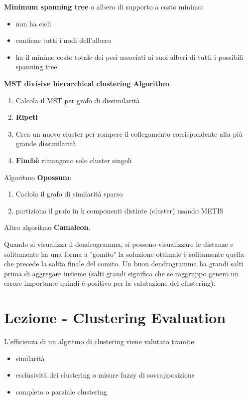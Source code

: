 \textbf{Minimum spanning tree} o albero di supporto a costo minimo:
\begin{itemize}
	\item non ha cicli
	\item contiene tutti i nodi dell'albero
	\item ha il minimo costo totale dei pesi associati ai suoi alberi di tutti i possibili spanning tree
\end{itemize}
\noindent
\textbf{MST divisive hierarchical clustering Algorithm}
\begin{enumerate}
	\item Calcola il MST per grafo di dissimilarit\`a
	\item \textbf{Ripeti}
	\item Crea un nuovo cluster per rompere il collegamento corrispondente alla pi\`u grande dissimilarit\`a
	\item \textbf{Finch\`e} rimangono solo cluster singoli
\end{enumerate}
\noindent
Algoritmo \textbf{Opossum}:
\begin{enumerate}
	\item Caclola il grafo di similarit\`a sparso
	\item partiziona il grafo in k componenti distinte (cluster) usando METIS
\end{enumerate}
\noindent
Altro algoritmo \textbf{Camaleon}.

Quando si visualizza il dendrogramma, si possono visualizzare le distanze e solitamente ha una forma a "gomito" la soluzione ottimale \`e solitamente quella che precede la salita finale del comito. Un buon dendrogramma ha grandi salti prima di aggregare insieme (salti grandi significa che se raggruppo genero un errore importante quindi \`e positivo per la valutazione del clustering). 

\section{Lezione - Clustering Evaluation}

L'efficienza di un algritmo di clustering viene valutato tramite:
\begin{itemize}
	\item similarit\`a
	\item esclusivit\`a dei clustering o misure fuzzy di sovrapposizione
	\item completo o parziale clustering
\end{itemize}

